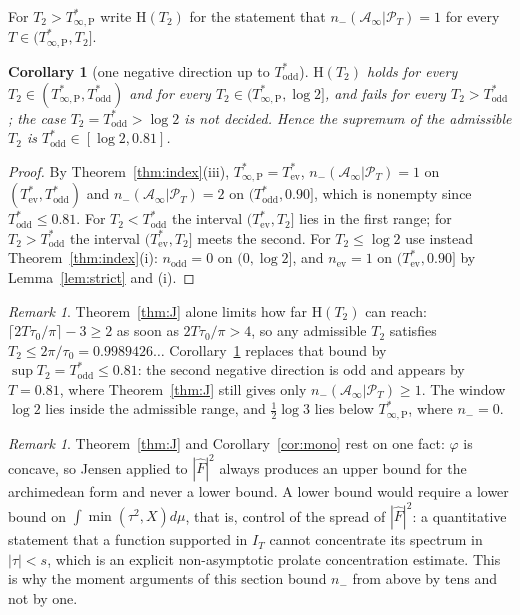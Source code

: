 \documentclass[11pt]{amsart}
\newtheorem{corollary}[theorem]{Corollary}
\theoremstyle{definition}
\theoremstyle{remark}
\newtheorem{remark}[theorem]{Remark}
\newcommand{\PT}{\mathcal P_T}
\newcommand{\IT}{I_T}
\newcommand{\Fh}{\widehat F}
\newcommand{\Ainf}{\mathcal A_\infty}
\begin{document}
For $T_2>T^*_{\infty,\mathrm P}$ write $\mathrm H(T_2)$ for the statement that
$n_-(\Ainf|\PT)=1$ for every $T\in(T^*_{\infty,\mathrm P},T_2]$.

\begin{corollary}[one negative direction up to $T^*_{\mathrm{odd}}$]\label{cor:H1}
$\mathrm H(T_2)$ holds for every
$T_2\in(T^*_{\infty,\mathrm P},T^*_{\mathrm{odd}})$ and for every $T_2\in(T^*_{\infty,\mathrm P},\log2]$, and
fails for every $T_2>T^*_{\mathrm{odd}}$; the case $T_2=T^*_{\mathrm{odd}}>\log2$ is not decided. Hence the supremum of the admissible $T_2$ is
$T^*_{\mathrm{odd}}\in[\log2,0.81]$.
\end{corollary}
\begin{proof}
By Theorem~\ref{thm:index}(iii), $T^*_{\infty,\mathrm P}=T^*_{\mathrm{ev}}$, $n_-(\Ainf|\PT)=1$ on
$(T^*_{\mathrm{ev}},T^*_{\mathrm{odd}})$ and $n_-(\Ainf|\PT)=2$ on $(T^*_{\mathrm{odd}},0.90]$, which is
nonempty since $T^*_{\mathrm{odd}}\le0.81$. For $T_2<T^*_{\mathrm{odd}}$ the interval
$(T^*_{\mathrm{ev}},T_2]$ lies in the first range; for $T_2>T^*_{\mathrm{odd}}$ the interval
$(T^*_{\mathrm{ev}},T_2]$ meets the second. For $T_2\le\log2$ use instead Theorem~\ref{thm:index}(i):
$n_{\mathrm{odd}}=0$ on $(0,\log2]$, and $n_{\mathrm{ev}}=1$ on $(T^*_{\mathrm{ev}},0.90]$ by
Lemma~\ref{lem:strict} and (i).
\end{proof}

\begin{remark}
Theorem~\ref{thm:J} alone limits how far $\mathrm H(T_2)$ can reach:
$\lceil2T\tau_0/\pi\rceil-3\ge2$ as soon as $2T\tau_0/\pi>4$, so any admissible $T_2$ satisfies
$T_2\le2\pi/\tau_0=0.9989426\ldots$ Corollary~\ref{cor:H1} replaces that bound by
$\sup T_2=T^*_{\mathrm{odd}}\le0.81$: the second negative direction is odd and appears by $T=0.81$, where
Theorem~\ref{thm:J} still gives only $n_-(\Ainf|\PT)\ge1$. The window $\log2$ lies inside the admissible
range, and $\frac12\log3$ lies below $T^*_{\infty,\mathrm P}$, where $n_-=0$.
\end{remark}

\begin{remark}
Theorem~\ref{thm:J} and Corollary~\ref{cor:mono} rest on one fact: $\varphi$ is
concave, so Jensen applied to $|\Fh|^2$ always produces an upper bound for the archimedean form
and never a lower bound. A lower bound would require a lower bound on $\int\min(\tau^2,X)d\mu$, that
is, control of the spread of $|\Fh|^2$: a quantitative statement that a function supported in $\IT$
cannot concentrate its spectrum in $|\tau|<s$, which is an explicit non-asymptotic prolate
concentration estimate. This is why the moment arguments of this section bound $n_-$ from above
by tens and not by one.
\end{remark}
\end{document}
